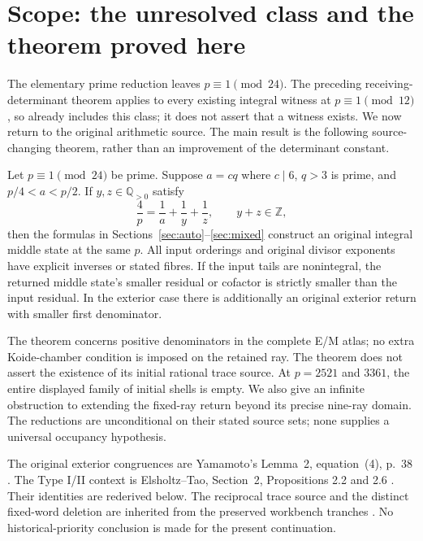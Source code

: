 \section{Scope: the unresolved class and the theorem proved here}
The elementary prime reduction leaves $p\equiv1\pmod{24}$. The preceding
receiving-determinant theorem applies to every existing integral witness at
$p\equiv1\pmod{12}$, so already includes this class; it does not assert that a
witness exists. We now return to the original arithmetic source. The main
result is the following source-changing theorem, rather than an improvement
of the determinant constant.

\begin{theorem}\label{thm:mixed}
Let $p\equiv1\pmod{24}$ be prime. Suppose $a=cq$ where $c\mid6$, $q>3$ is prime,
and $p/4<a<p/2$. If $y,z\in\mathbb Q_{>0}$ satisfy
\[
 \frac4p=\frac1a+\frac1y+\frac1z,\qquad y+z\in\mathbb Z,
\]
then the formulas in Sections~\ref{sec:auto}--\ref{sec:mixed} construct an
original integral middle state at the same $p$. All input orderings and
original divisor exponents have explicit inverses or stated fibres. If the
input tails are nonintegral, the returned middle state's smaller residual or
cofactor is strictly smaller than the input residual. In the exterior case
there is additionally an original exterior return with smaller first denominator.
\end{theorem}

The theorem concerns positive denominators in the complete E/M atlas; no extra
Koide-chamber condition is imposed on the retained ray. The theorem does not
assert the existence of its initial rational trace source.
At $p=2521$ and $3361$, the entire displayed family of initial shells is empty.
We also give an infinite obstruction to extending the fixed-ray return beyond
its precise nine-ray domain. The reductions are unconditional on their stated
source sets; none supplies a universal occupancy hypothesis.

The original exterior congruences are Yamamoto's Lemma~2, equation~(4), p.~38
\cite{Yamamoto}. The Type I/II context is Elsholtz--Tao, Section~2, Propositions
2.2 and 2.6 \cite{ET}. Their identities are rederived below. The reciprocal
trace source and the distinct fixed-word deletion are inherited from the
preserved workbench tranches \cite{Trace,Word}. No historical-priority conclusion
is made for the present continuation.

